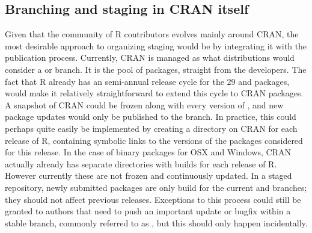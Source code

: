 \subsection{Branching and staging in CRAN itself}

Given that the community of R contributors evolves mainly around CRAN, the most
desirable approach to organizing staging would be by integrating it with the
publication process. Currently, CRAN is managed as what distributions would
consider a  or  branch. It is the pool of
 packages, straight from the developers.
%
%
The fact that R already has an semi-annual release cycle for the 29 
and  packages, would make it relatively straightforward to
extend this cycle to CRAN packages. A snapshot of CRAN could be frozen along
with every version of , and new package updates would only be
published to the  branch. In practice, this could perhaps quite
easily be implemented by creating a directory on CRAN for each release of R,
containing symbolic links to the versions of the packages considered
 for this release. In the case of binary packages for OSX and
Windows, CRAN actually already has separate directories with builds for each
release of R. However currently these are not frozen and continuously updated.
In a staged repository, newly submitted packages are only build for the current
 and  branches; they should not affect previous
releases. Exceptions to this process could still be granted to authors that need
to push an important update or bugfix within a stable branch, commonly referred
to as , but this should only happen incidentally.

